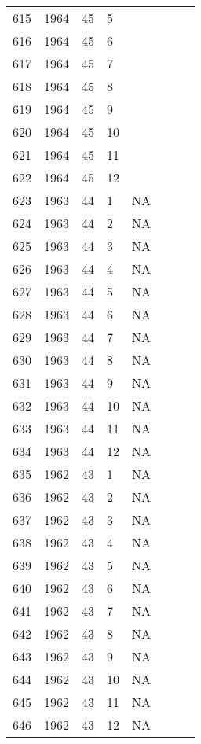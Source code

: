 \begin{longtable}{ |l|l|l|l|l|l|l|l| }
615 & 1964 & 45 &     5 &         &  &  & \\
616 & 1964 & 45 &     6 &         &  &  & \\
617 & 1964 & 45 &     7 &         &  &  & \\
618 & 1964 & 45 &     8 &         &  &  & \\
619 & 1964 & 45 &     9 &         &  &  & \\
620 & 1964 & 45 &    10 &         &  &  & \\
621 & 1964 & 45 &    11 &         &  &  & \\
622 & 1964 & 45 &    12 &         &  &  & \\
623 & 1963 & 44 &     1 &      NA &  &  & \\
624 & 1963 & 44 &     2 &      NA &  &  & \\
625 & 1963 & 44 &     3 &      NA &  &  & \\
626 & 1963 & 44 &     4 &      NA &  &  & \\
627 & 1963 & 44 &     5 &      NA &  &  & \\
628 & 1963 & 44 &     6 &      NA &  &  & \\
629 & 1963 & 44 &     7 &      NA &  &  & \\
630 & 1963 & 44 &     8 &      NA &  &  & \\
631 & 1963 & 44 &     9 &      NA &  &  & \\
632 & 1963 & 44 &    10 &      NA &  &  & \\
633 & 1963 & 44 &    11 &      NA &  &  & \\
634 & 1963 & 44 &    12 &      NA &  &  & \\
635 & 1962 & 43 &     1 &      NA &  &  & \\
636 & 1962 & 43 &     2 &      NA &  &  & \\
637 & 1962 & 43 &     3 &      NA &  &  & \\
638 & 1962 & 43 &     4 &      NA &  &  & \\
639 & 1962 & 43 &     5 &      NA &  &  & \\
640 & 1962 & 43 &     6 &      NA &  &  & \\
641 & 1962 & 43 &     7 &      NA &  &  & \\
642 & 1962 & 43 &     8 &      NA &  &  & \\
643 & 1962 & 43 &     9 &      NA &  &  & \\
644 & 1962 & 43 &    10 &      NA &  &  & \\
645 & 1962 & 43 &    11 &      NA &  &  & \\
646 & 1962 & 43 &    12 &      NA &  &  & \\
\end{longtable}
